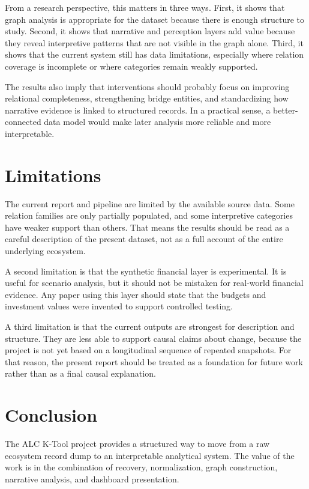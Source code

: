 \documentclass[11pt,a4paper]{article}
\begin{document}
From a research perspective, this matters in three ways. First, it shows
that graph analysis is appropriate for the dataset because there is
enough structure to study. Second, it shows that narrative and
perception layers add value because they reveal interpretive patterns
that are not visible in the graph alone. Third, it shows that the
current system still has data limitations, especially where relation
coverage is incomplete or where categories remain weakly supported.

The results also imply that interventions should probably focus on
improving relational completeness, strengthening bridge entities, and
standardizing how narrative evidence is linked to structured records. In
a practical sense, a better-connected data model would make later
analysis more reliable and more interpretable.

\section{Limitations}

The current report and pipeline are limited by the available source
data. Some relation families are only partially populated, and some
interpretive categories have weaker support than others. That means the
results should be read as a careful description of the present dataset,
not as a full account of the entire underlying ecosystem.

A second limitation is that the synthetic financial layer is
experimental. It is useful for scenario analysis, but it should not be
mistaken for real-world financial evidence. Any paper using this layer
should state that the budgets and investment values were invented to
support controlled testing.

A third limitation is that the current outputs are strongest for
description and structure. They are less able to support causal claims
about change, because the project is not yet based on a longitudinal
sequence of repeated snapshots. For that reason, the present report
should be treated as a foundation for future work rather than as a final
causal explanation.

\section{Conclusion}

The ALC K-Tool project provides a structured way to move from a raw
ecosystem record dump to an interpretable analytical system. The value
of the work is in the combination of recovery, normalization, graph
construction, narrative analysis, and dashboard presentation.
\end{document}

